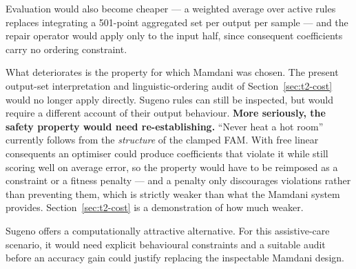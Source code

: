 Evaluation would also become cheaper --- a weighted average over active rules
replaces integrating a 501-point aggregated set per output per sample --- and
the repair operator would apply only to the input half, since consequent
coefficients carry no ordering constraint.

What deteriorates is the property for which Mamdani was chosen.
The present output-set interpretation and linguistic-ordering audit of
Section~\ref{sec:t2-cost} would no longer apply directly. Sugeno rules can still
be inspected, but would require a different account of their output behaviour.
\textbf{More seriously, the safety property would need re-establishing.} ``Never
heat a hot room'' currently follows from the \emph{structure} of the clamped FAM.
With free linear consequents an optimiser could produce coefficients that
violate it while still scoring well on average error, so the property would have
to be reimposed as a constraint or a fitness penalty --- and a penalty only
discourages violations rather than preventing them, which is strictly weaker
than what the Mamdani system provides. Section~\ref{sec:t2-cost} is a
demonstration of how much weaker.

Sugeno offers a computationally attractive alternative. For this assistive-care
scenario, it would need explicit behavioural constraints and a suitable audit
before an accuracy gain could justify replacing the inspectable Mamdani design.



